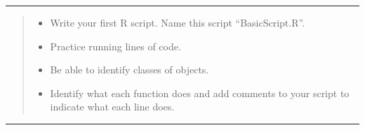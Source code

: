\documentclass[
]{book}
\providecommand{\tightlist}{%
  \setlength{\itemsep}{0pt}\setlength{\parskip}{0pt}}
\begin{document}
\begin{center}\rule{0.5\linewidth}{0.5pt}\end{center}

\begin{quote}
\begin{itemize}
\tightlist
\item
  Write your first R script. Name this script ``BasicScript.R''.
\item
  Practice running lines of code.
\item
  Be able to identify classes of objects.\\
\item
  Identify what each function does and add comments to your script to indicate what each line does.
\end{itemize}
\end{quote}

\begin{center}\rule{0.5\linewidth}{0.5pt}\end{center}
\end{document}
